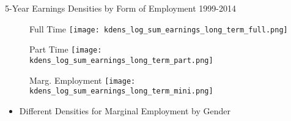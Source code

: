 \documentclass[hyperref={bookmarks=false}]{beamer}
\begin{document}
\begin{appendix}
\begin{frame}{5-Year Earnings Densities by Form of Employment}
1999-2014
\begin{figure}[!t]
\centering
\begin{minipage}[b]{0.32\textwidth}{Full Time}
\centering
\texttt{[image: kdens\_log\_sum\_earnings\_long\_term\_full.png]}
\end{minipage}
\begin{minipage}[b]{0.32\textwidth}{Part Time}
\centering
\texttt{[image: kdens\_log\_sum\_earnings\_long\_term\_part.png]}
\end{minipage}
\begin{minipage}[b]{0.32\textwidth}{Marg. Employment}
\centering
\texttt{[image: kdens\_log\_sum\_earnings\_long\_term\_mini.png]}
\end{minipage}
\end{figure}
\begin{itemize}
\setlength{\itemsep}{0.7 cm}
\item Different Densities for Marginal Employment by Gender
\end{itemize}
\hyperlink{DATA5}{}
\end{frame}



\end{appendix}

%
%
%
%
\end{document}
